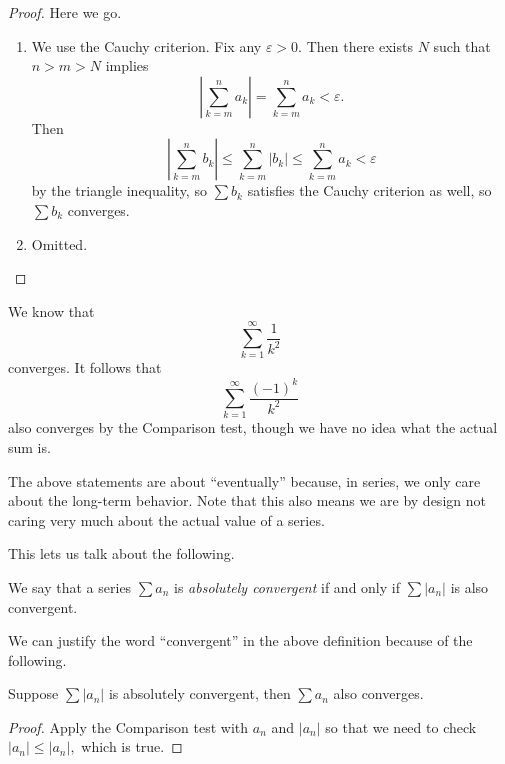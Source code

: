 \begin{proof}
	Here we go.
	\begin{enumerate}[label=(\alph*)]
		\item We use the Cauchy criterion. Fix any $\varepsilon>0.$ Then there exists $N$ such that $n>m>N$ implies
		\[\left|\sum_{k=m}^na_k\right|=\sum_{k=m}^na_k<\varepsilon.\]
		Then
		\[\left|\sum_{k=m}^nb_k\right|\le\sum_{k=m}^n|b_k|\le\sum_{k=m}^na_k<\varepsilon\]
		by the triangle inequality, so $\sum b_k$ satisfies the Cauchy criterion as well, so $\sum b_k$ converges.
		\item Omitted.
		\qedhere
	\end{enumerate}
\end{proof}
\begin{example}
	We know that
	\[\sum_{k=1}^\infty\frac1{k^2}\]
	converges. It follows that
	\[\sum_{k=1}^\infty\frac{(-1)^k}{k^2}\]
	also converges by the Comparison test, though we have no idea what the actual sum is.
\end{example}
\begin{warn}
	The above statements are about ``eventually'' because, in series, we only care about the long-term behavior. Note that this also means we are by design not caring very much about the actual value of a series.
\end{warn}

This lets us talk about the following.
\begin{definition}
	We say that a series $\sum a_n$ is \textit{absolutely convergent} if and only if $\sum|a_n|$ is also convergent.
\end{definition}
We can justify the word ``convergent'' in the above definition because of the following.
\begin{prop}
	Suppose $\sum|a_n|$ is absolutely convergent, then $\sum a_n$ also converges.
\end{prop}
\begin{proof}
	Apply the Comparison test with $a_n$ and $|a_n|$ so that we need to check $|a_n|\le|a_n|,$ which is true.
\end{proof}

